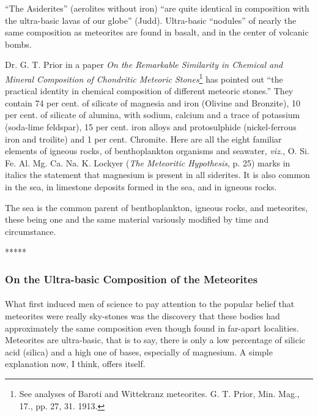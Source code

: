 \documentclass[a4paper, 12pt, oneside]{article}
\begin{document}
``The Asiderites'' (aerolites without iron) ``are quite identical in composition with the ultra-basic lavas of our globe'' (Judd). Ultra-basic ``nodules'' of nearly the same composition as meteorites are found in basalt, and in the center of volcanic bombs.

Dr. G. T. Prior in a paper \emph{On the Remarkable Similarity in Chemical and Mineral Composition of Chondritic Meteoric Stones}\footnote{See analyses of Baroti and Wittekranz meteorites. G. T. Prior, Min. Mag., 17., pp. 27, 31. 1913.} has pointed out ``the practical identity in chemical composition of different meteoric stones.'' They contain 74 per cent. of silicate of magnesia and iron (Olivine and Bronzite), 10 per cent. of silicate of alumina, with sodium, calcium and a trace of potassium (soda-lime feldspar), 15 per cent. iron alloys and protosulphide (nickel-ferrous iron and troilite) and 1 per cent. Chromite. Here are all the eight familiar elements of igneous rocks, of benthoplankton organisms and seawater, \emph{viz.}, O. Si. Fe. Al. Mg. Ca. Na. K. Lockyer (\emph{The Meteoritic Hypothesis}, p. 25) marks in italics the statement that magnesium is present in all siderites. It is also common in the sea, in limestone deposits formed in the sea, and in igneous rocks.

The sea is the common parent of benthoplankton, igneous rocks, and meteorites, these being one and the same material variously modified by time and circumstance.

\centerline{*\hspace{15mm}*\hspace{15mm}*\hspace{15mm}*\hspace{15mm}*}
\bigskip

\subsubsection{On the Ultra-basic Composition of the Meteorites}
\paragraph{}
What first induced men of science to pay attention to the popular belief that meteorites were really sky-stones was the discovery that these bodies had approximately the same composition even though found in far-apart localities. Meteorites are ultra-basic, that is to say, there is only a low percentage of silicic acid (silica) and a high one of bases, especially of magnesium. A simple explanation now, I think, offers itself.
\end{document}
